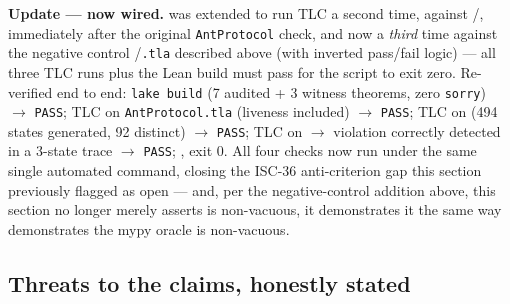 \documentclass[
  english,
]{article}
\theoremstyle{definition}
\begin{document}
\textbf{Update --- now wired.} 
was extended to run TLC a second time, against
/,
immediately after the original \texttt{AntProtocol} check, and now a
\emph{third} time against the negative control
/\texttt{.tla} described above
(with inverted pass/fail logic) --- all three TLC runs plus the Lean
build must pass for the script to exit zero. Re-verified end to end:
\texttt{lake\ build} (7 audited + 3 witness theorems, zero
\texttt{sorry}) \texorpdfstring{\ensuremath{\to}}{->} \texttt{PASS}; TLC on \texttt{AntProtocol.tla}
(liveness included) \texorpdfstring{\ensuremath{\to}}{->} \texttt{PASS}; TLC on
 (494 states generated, 92 distinct) \texorpdfstring{\ensuremath{\to}}{->}
\texttt{PASS}; TLC on  \texorpdfstring{\ensuremath{\to}}{->}
violation correctly detected in a 3-state trace \texorpdfstring{\ensuremath{\to}}{->} \texttt{PASS};
,
exit 0. All four checks now run under the same single automated command,
closing the ISC-36 anti-criterion gap this section previously flagged as
open --- and, per the negative-control addition above, this section no
longer merely asserts  is non-vacuous, it
demonstrates it the same way  demonstrates
the mypy oracle is non-vacuous.

\subsection{Threats to the claims, honestly
stated}\label{threats-to-the-claims-honestly-stated}
\end{document}
